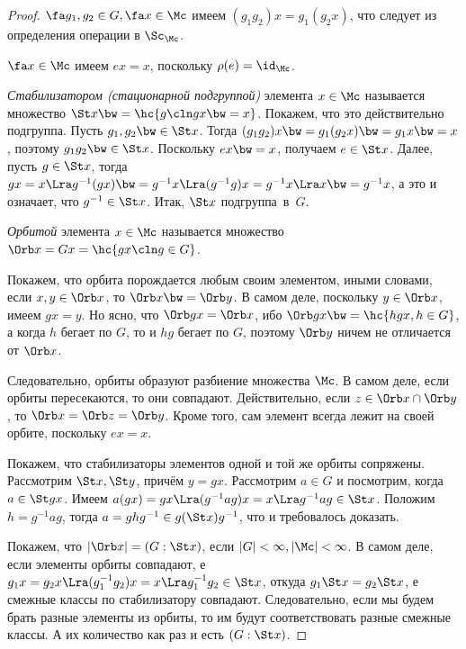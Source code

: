 \documentclass[a4paper]{article}
\begin{document}
\begin{proof}
 $\fa g_1, g_2 \in G, \fa x \in \Mc$ имеем $(g_1g_2)x=g_1(g_2x)$, что  следует из определения операции
в $\Sc_\Mc$.

 $\fa x \in \Mc$ имеем $ex=x$, поскольку $\rho(e) = \id_\Mc$.


\begin{df}
\emph{Стабилизатором (стационарной подгруппой)} элемента $x \in \Mc$ называется множество $\St x \bw=
\hc{g\cln gx\bw=x}$. Покажем, что это действительно подгруппа. Пусть $g_1, g_2 \bw\in \St x$. Тогда
$(g_1g_2)x\bw=g_1(g_2x) \bw= g_1x\bw=x$, поэтому $g_1g_2 \bw\in \St x$. Поскольку $ex\bw=x$, получаем $e \in
\St x$. Далее, пусть $g \in \St x$, тогда $gx=x \Lra g^{-1}(gx)\bw= g^{-1}x \Lra (g^{-1}g)x=g^{-1}x \Lra x \bw=
g^{-1}x$, а это и означает, что $g^{-1} \in \St x$. Итак, $\St x$ подгруппа~в~$G$.
\end{df}

\begin{df}
\emph{Орбитой} элемента $x \in \Mc$ называется множество $\Orb x = Gx = \hc{gx\cln g \in G}$.
\end{df}

Покажем, что орбита порождается любым своим элементом, иными словами, если  $x, y \in \Orb x$, то $\Orb
x\bw=\Orb y$. В самом деле, поскольку $y \in \Orb x$, имеем $gx=y$. Но ясно, что $\Orb gx = \Orb x$, ибо $\Orb
gx \bw= \hc{hgx, h \in G}$, а когда $h$ бегает по $G$, то и $hg$ бегает по $G$, поэтому $\Orb y$ ничем не
отличается от $\Orb x$.

Следовательно, орбиты образуют разбиение множества $\Mc$. В самом деле, если  орбиты пересекаются, то они
совпадают. Действительно, если $z\in\Orb x \cap \Orb y$, то $\Orb x=\Orb z=\Orb y$. Кроме того, сам элемент
всегда лежит на своей орбите, поскольку $ex=x$.

Покажем, что стабилизаторы элементов одной и той же орбиты сопряжены. Рассмотрим $\St x, \St y$, причём $y=gx$. Рассмотрим $a \in G$ и посмотрим,
когда $a \in \St gx$. Имеем $a(gx)=gx \Lra (g^{-1}ag)x=x \Lra g^{-1}ag \in \St x$. Положим $h = g^{-1}ag$, тогда $a=ghg^{-1} \in g(\St x)g^{-1}$,
что и требовалось доказать.

Покажем, что $|\Orb x| = (G: \St x)$, если $|G| < \infty, |\Mc| < \infty$. В  самом деле, если элементы
орбиты совпадают, е $g_1x=g_2x \Lra (g_1^{-1}g_2)x=x \Lra g_1^{-1}g_2 \in \St x$, откуда $g_1\St x =
g_2\St x$, е смежные классы по стабилизатору совпадают. Следовательно, если мы будем брать разные элементы
из орбиты, то им будут соответствовать разные смежные классы. А их количество как раз и есть $(G: \St x)$.


\end{proof}
\end{document}

